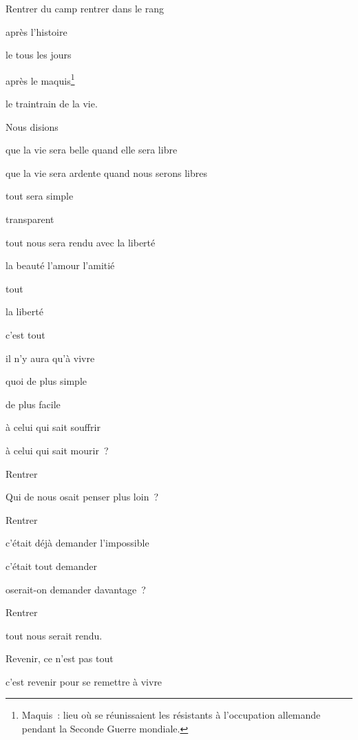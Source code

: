 	{\setlength{\parskip}{0pt}
	
Rentrer du camp rentrer dans le rang
	
après l'histoire

le tous les jours

après le maquis\footnote{Maquis~: lieu où se réunissaient les résistants à l'occupation allemande pendant la Seconde Guerre mondiale.}

le traintrain de la vie.

Nous disions

que la vie sera belle quand elle sera libre

que la vie sera ardente quand nous serons libres

tout sera simple

transparent

tout nous sera rendu avec la liberté

la beauté l'amour l'amitié

tout

la liberté

c'est tout

il n'y aura qu'à vivre

quoi de plus simple

de plus facile

à celui qui sait souffrir

à celui qui sait mourir~?

Rentrer

Qui de nous osait penser plus loin~?

Rentrer

c'était déjà demander l'impossible

c'était tout demander

oserait-on demander davantage~?

Rentrer

tout nous serait rendu.


Revenir, ce n'est pas tout

c'est revenir pour se remettre à vivre

}
